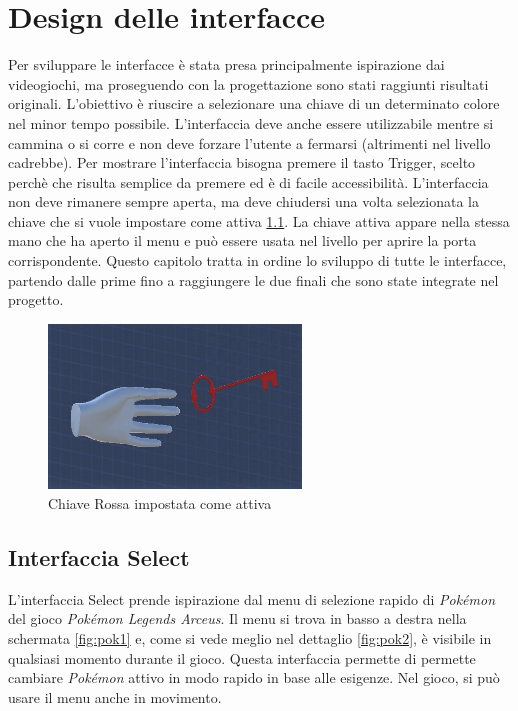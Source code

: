 \documentclass[target=bach,aauheader=]{thud}
\begin{document}
\chapter{Design delle interfacce} %
\label{design}
Per sviluppare le interfacce è stata presa principalmente ispirazione dai videogiochi, ma proseguendo con la progettazione sono stati raggiunti risultati originali. 
L'obiettivo è riuscire a selezionare una chiave di un determinato colore nel minor tempo possibile.
L'interfaccia deve anche essere utilizzabile mentre si cammina o si corre e non deve forzare l'utente a fermarsi (altrimenti nel livello cadrebbe).
Per mostrare l'interfaccia bisogna premere il tasto Trigger, scelto perchè che risulta semplice da premere ed è di facile accessibilità.  
L'interfaccia non deve rimanere sempre aperta, ma deve chiudersi una volta selezionata la chiave che si vuole impostare come attiva \ref{fig:key_red}.
La chiave attiva appare nella stessa mano che ha aperto il menu e può essere usata nel livello per aprire la porta corrispondente.
Questo capitolo tratta in ordine lo sviluppo di tutte le interfacce, partendo dalle prime fino a raggiungere le due finali che sono state integrate nel progetto.

\begin{figure}[h]
    \centering
    \includegraphics[width=0.60\textwidth]{key_red}
    \caption{Chiave Rossa impostata come attiva}
    \label{fig:key_red}
\end{figure}

\section{Interfaccia Select} %
\label{select}
L'interfaccia Select prende ispirazione dal menu di selezione rapido di \textit{Pokémon} del gioco \textit{Pokémon Legends Arceus}. 
Il menu si trova in basso a destra nella schermata \ref{fig:pok1} e, come si vede meglio nel dettaglio \ref{fig:pok2},  è visibile in qualsiasi momento durante il gioco.
Questa interfaccia permette di permette cambiare \textit{Pokémon} attivo in modo rapido in base alle esigenze. 
Nel gioco, si può usare il menu anche in movimento.
\end{document}
